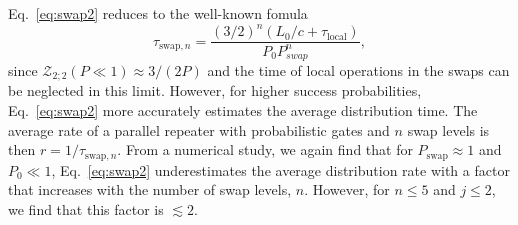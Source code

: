 Eq.~\eqref{eq:swap2} reduces to the well-known fomula
\cite{sangouard3,sangouard2}
\begin{equation}
\tau_{\text{swap},n}=\frac{\left(3/2\right)^{n}
\left(L_{0}/c+\tau_{\text{local}}\right)}{P_{0}P_{swap}^{n}},
\end{equation}
since $\mathcal{Z}_{2;2}(P\ll1)\approx3/(2P)$ and the time of local operations
in the swaps can be neglected in this limit. However, for higher success
probabilities, Eq.~\eqref{eq:swap2} more accurately estimates the average
distribution time. The average rate of a parallel repeater with probabilistic
gates and $n$ swap levels is then $r=1/\tau_{\text{swap},n}$. From a numerical
study, we again find that for $P_{\text{swap}}\approx1$ and $P_{0}\ll1$,
Eq.~\eqref{eq:swap2} underestimates the average distribution rate with a factor
that increases with the number of swap levels, $n$. However, for $n\leq 5$ and
$j\leq2$, we find that this factor is $\lesssim2$.

